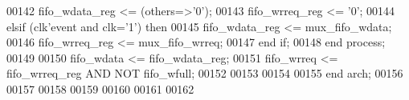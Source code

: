 \begin{DoxyCode}
00142       \textcolor{vhdlchar}{fifo_wdata_reg} \textcolor{vhdlchar}{<=} \textcolor{vhdlchar}{(}\textcolor{keywordflow}{others}\textcolor{vhdlchar}{=}\textcolor{vhdlchar}{>}\textcolor{vhdlchar}{'}\textcolor{vhdllogic}{}\textcolor{vhdllogic}{0}\textcolor{vhdlchar}{'}\textcolor{vhdlchar}{)};
00143       \textcolor{vhdlchar}{fifo_wrreq_reg} \textcolor{vhdlchar}{<=} \textcolor{vhdlchar}{'}\textcolor{vhdllogic}{}\textcolor{vhdllogic}{0}\textcolor{vhdlchar}{'};
00144    \textcolor{keywordflow}{elsif} \textcolor{vhdlchar}{(}\textcolor{vhdlchar}{clk}\textcolor{vhdlchar}{'}\textcolor{vhdlkeyword}{event} \textcolor{keywordflow}{and} \textcolor{vhdlchar}{clk}\textcolor{vhdlchar}{=}\textcolor{vhdlchar}{'}\textcolor{vhdllogic}{}\textcolor{vhdllogic}{1}\textcolor{vhdlchar}{'}\textcolor{vhdlchar}{)} \textcolor{keywordflow}{then} 
00145       \textcolor{vhdlchar}{fifo_wdata_reg} \textcolor{vhdlchar}{<=} \textcolor{vhdlchar}{mux_fifo_wdata};
00146       \textcolor{vhdlchar}{fifo_wrreq_reg} \textcolor{vhdlchar}{<=} \textcolor{vhdlchar}{mux_fifo_wrreq};
00147    \textcolor{keywordflow}{end} \textcolor{keywordflow}{if};
00148 \textcolor{keywordflow}{end} \textcolor{keywordflow}{process}; 
00149 
00150 \textcolor{vhdlchar}{fifo_wdata} \textcolor{vhdlchar}{<=} \textcolor{vhdlchar}{fifo_wdata_reg};
00151 \textcolor{vhdlchar}{fifo_wrreq} \textcolor{vhdlchar}{<=} \textcolor{vhdlchar}{fifo_wrreq_reg} \textcolor{keywordflow}{AND} \textcolor{keywordflow}{NOT} \textcolor{vhdlchar}{fifo_wfull};
00152         
00153         
00154 
00155 \textcolor{keywordflow}{end} \textcolor{vhdlchar}{arch};   
00156 
00157 
00158 
00159 
00160 
00161 
00162 
\end{DoxyCode}
